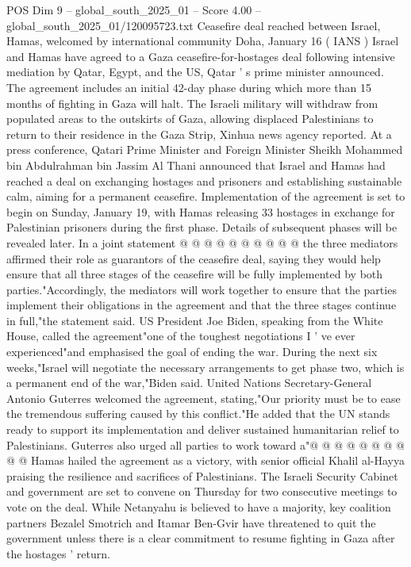 \begin{textsample}{POS Dim 9 – global\_south\_2025\_01 – Score 4.00 – global\_south\_2025\_01/120095723.txt}  \label{ex:f9_pos_347}
Ceasefire deal reached between Israel, Hamas, welcomed by international community Doha, January 16 ( IANS ) Israel and Hamas have agreed to a Gaza ceasefire-for-hostages deal following intensive mediation by Qatar, Egypt, and the US, Qatar ' s prime minister announced.
The agreement includes an initial 42-day phase during which more than 15 months of fighting in Gaza will halt.
The Israeli military will withdraw from populated areas to the outskirts of Gaza, allowing displaced Palestinians to return to their residence in the Gaza Strip, Xinhua news agency reported.
At a press conference, Qatari Prime Minister and Foreign Minister Sheikh Mohammed bin Abdulrahman bin Jassim Al Thani announced that Israel and Hamas had reached a deal on exchanging hostages and prisoners and establishing sustainable calm, aiming for a permanent ceasefire.
Implementation of the agreement is set to begin on Sunday, January 19, with Hamas releasing 33 hostages in exchange for Palestinian prisoners during the first phase.
Details of subsequent phases will be revealed later.
In a joint statement @ @ @ @ @ @ @ @ @ @ the three mediators affirmed their role as guarantors of the ceasefire deal, saying they would help ensure that all three stages of the ceasefire will be fully implemented by both parties."Accordingly, the mediators will work together to ensure that the parties implement their obligations in the agreement and that the three stages continue in full,"the statement said.
US President Joe Biden, speaking from the White House, called the agreement"one of the toughest negotiations I ' ve ever experienced"and emphasised the goal of ending the war.
During the next six weeks,"Israel will negotiate the necessary arrangements to get phase two, which is a permanent end of the war,"Biden said.
United Nations Secretary-General Antonio Guterres welcomed the agreement, stating,"Our priority must be to ease the tremendous suffering caused by this conflict."He added that the UN stands ready to support its implementation and deliver sustained humanitarian relief to Palestinians.
Guterres also urged all parties to work toward a"@ @ @ @ @ @ @ @ @ @ Hamas hailed the agreement as a victory, with senior official Khalil al-Hayya praising the resilience and sacrifices of Palestinians.
The Israeli Security Cabinet and government are set to convene on Thursday for two consecutive meetings to vote on the deal.
While Netanyahu is believed to have a majority, key coalition partners Bezalel Smotrich and Itamar Ben-Gvir have threatened to quit the government unless there is a clear commitment to resume fighting in Gaza after the hostages ' return.

\end{textsample}
